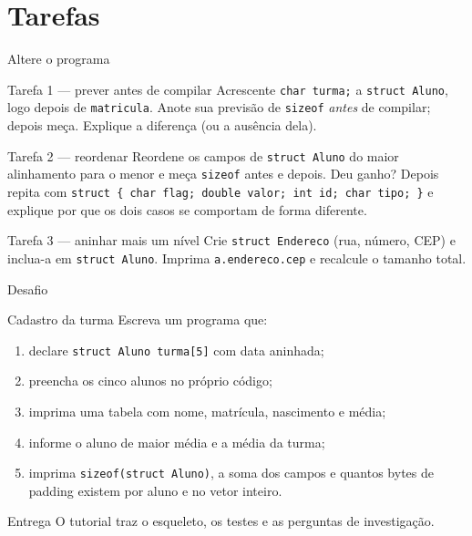 \documentclass[aspectratio=169]{beamer}
\begin{document}
\section{Tarefas}

\begin{frame}{Altere o programa}
  \begin{block}{Tarefa 1 --- prever antes de compilar}
    Acrescente \texttt{char turma;} a \texttt{struct Aluno}, logo depois de
    \texttt{matricula}. Anote sua previsão de \texttt{sizeof} \emph{antes} de
    compilar; depois meça. Explique a diferença (ou a ausência dela).
  \end{block}
  \begin{block}{Tarefa 2 --- reordenar}
    Reordene os campos de \texttt{struct Aluno} do maior alinhamento para o
    menor e meça \texttt{sizeof} antes e depois. Deu ganho? Depois repita com
    \texttt{struct \{ char flag; double valor; int id; char tipo; \}} e explique
    por que os dois casos se comportam de forma diferente.
  \end{block}
  \begin{block}{Tarefa 3 --- aninhar mais um nível}
    Crie \texttt{struct Endereco} (rua, número, CEP) e inclua-a em
    \texttt{struct Aluno}. Imprima \texttt{a.endereco.cep} e recalcule o
    tamanho total.
  \end{block}
\end{frame}

\begin{frame}{Desafio}
  \begin{exampleblock}{Cadastro da turma}
    Escreva um programa que:
    \begin{enumerate}
      \item declare \texttt{struct Aluno turma[5]} com data aninhada;
      \item preencha os cinco alunos no próprio código;
      \item imprima uma tabela com nome, matrícula, nascimento e média;
      \item informe o aluno de maior média e a média da turma;
      \item imprima \texttt{sizeof(struct Aluno)}, a soma dos campos e quantos
        bytes de padding existem por aluno e no vetor inteiro.
    \end{enumerate}
  \end{exampleblock}
  \begin{block}{Entrega}
    O tutorial traz o esqueleto, os testes e as perguntas de investigação.
  \end{block}
\end{frame}
\end{document}
